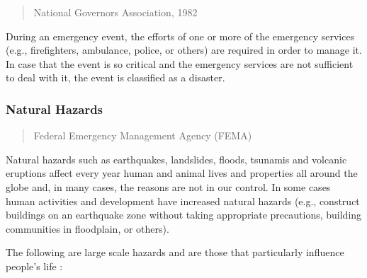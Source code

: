 \begin{quotation}
{\footnotesize
{}
\begin{flushright}
National Governors Association, 1982
\end{flushright}
}
\end{quotation}

\noindent During an emergency event, the efforts of one or more of the emergency services (e.g., firefighters, ambulance, police, or others) are required in order to manage it. In case that the event is so critical and the emergency services are not sufficient to deal with it, the event is classified as a disaster.

\subsubsection{Natural Hazards}

\begin{quotation}
{\footnotesize
{}
\begin{flushright}
Federal Emergency Management Agency (FEMA)
\end{flushright}
}
\end{quotation}

\noindent Natural hazards such as earthquakes, landslides, floods, tsunamis and volcanic eruptions affect every year human and animal lives and properties all around the globe and, in many cases, the reasons are not in our control. In some cases human activities and development have increased natural hazards (e.g., construct buildings on an earthquake zone without taking appropriate precautions, building communities in floodplain, or others).

The following are large scale hazards and are those that particularly influence people's life :

